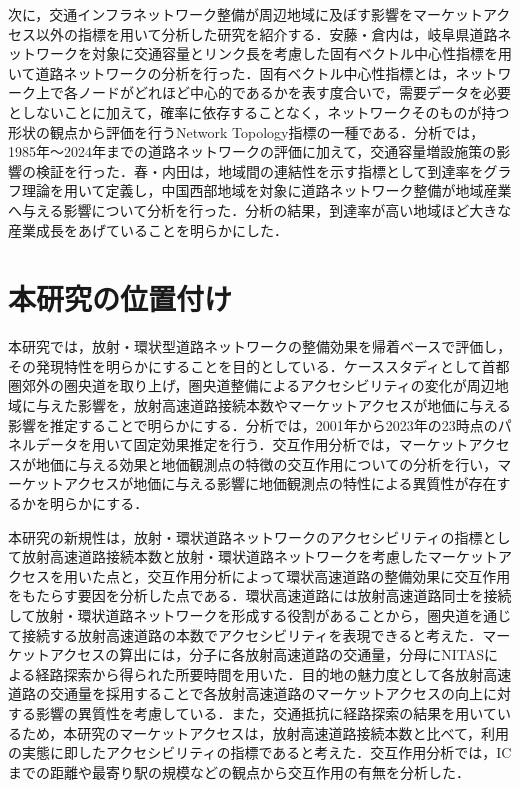 次に，交通インフラネットワーク整備が周辺地域に及ぼす影響をマーケットアクセス以外の指標を用いて分析した研究を紹介する．安藤・倉内\cite{kurauchi2020}は，岐阜県道路ネットワークを対象に交通容量とリンク長を考慮した固有ベクトル中心性指標を用いて道路ネットワークの分析を行った．固有ベクトル中心性指標とは，ネットワーク上で各ノードがどれほど中心的であるかを表す度合いで，需要データを必要としないことに加えて，確率に依存することなく，ネットワークそのものが持つ形状の観点から評価を行うNetwork Topology指標の一種である．分析では，1985年〜2024年までの道路ネットワークの評価に加えて，交通容量増設施策の影響の検証を行った．春・内田\cite{haru2011}は，地域間の連結性を示す指標として到達率をグラフ理論を用いて定義し，中国西部地域を対象に道路ネットワーク整備が地域産業へ与える影響について分析を行った．分析の結果，到達率が高い地域ほど大きな産業成長をあげていることを明らかにした．

\section{本研究の位置付け}
本研究では，放射・環状型道路ネットワークの整備効果を帰着ベースで評価し，その発現特性を明らかにすることを目的としている．ケーススタディとして首都圏郊外の圏央道を取り上げ，圏央道整備によるアクセシビリティの変化が周辺地域に与えた影響を，放射高速道路接続本数やマーケットアクセスが地価に与える影響を推定することで明らかにする．分析では，2001年から2023年の23時点のパネルデータを用いて固定効果推定を行う．交互作用分析では，マーケットアクセスが地価に与える効果と地価観測点の特徴の交互作用についての分析を行い，マーケットアクセスが地価に与える影響に地価観測点の特性による異質性が存在するかを明らかにする．

本研究の新規性は，放射・環状道路ネットワークのアクセシビリティの指標として放射高速道路接続本数と放射・環状道路ネットワークを考慮したマーケットアクセスを用いた点と，交互作用分析によって環状高速道路の整備効果に交互作用をもたらす要因を分析した点である．環状高速道路には放射高速道路同士を接続して放射・環状道路ネットワークを形成する役割があることから，圏央道を通じて接続する放射高速道路の本数でアクセシビリティを表現できると考えた．マーケットアクセスの算出には，分子に各放射高速道路の交通量，分母にNITASによる経路探索から得られた所要時間を用いた．目的地の魅力度として各放射高速道路の交通量を採用することで各放射高速道路のマーケットアクセスの向上に対する影響の異質性を考慮している．また，交通抵抗に経路探索の結果を用いているため，本研究のマーケットアクセスは，放射高速道路接続本数と比べて，利用の実態に即したアクセシビリティの指標であると考えた．交互作用分析では，ICまでの距離や最寄り駅の規模などの観点から交互作用の有無を分析した．

